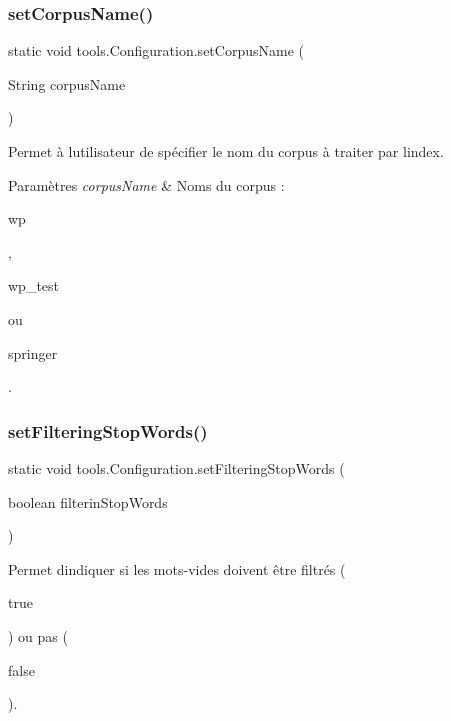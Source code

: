 \subsubsection{\texorpdfstring{set\+Corpus\+Name()}{setCorpusName()}}
{\footnotesize\ttfamily static void tools.\+Configuration.\+set\+Corpus\+Name (\begin{DoxyParamCaption}\item[{String}]{corpus\+Name }\end{DoxyParamCaption})\hspace{0.3cm}{\ttfamily [static]}}

Permet à l\textquotesingle{}utilisateur de spécifier le nom du corpus à traiter par l\textquotesingle{}index.


\begin{DoxyParams}{Paramètres}
{\em corpus\+Name} & Noms du corpus \+:
\begin{DoxyCode}
wp 
\end{DoxyCode}
 ,
\begin{DoxyCode}
wp\_test 
\end{DoxyCode}
 ou
\begin{DoxyCode}
springer 
\end{DoxyCode}
 . \\
\hline
\end{DoxyParams}
\mbox{\label{classtools_1_1Configuration_a1520b6e7f8a9a2f303813c73838d5a24}} 
\subsubsection{\texorpdfstring{set\+Filtering\+Stop\+Words()}{setFilteringStopWords()}}
{\footnotesize\ttfamily static void tools.\+Configuration.\+set\+Filtering\+Stop\+Words (\begin{DoxyParamCaption}\item[{boolean}]{filterin\+Stop\+Words }\end{DoxyParamCaption})\hspace{0.3cm}{\ttfamily [static]}}

Permet d\textquotesingle{}indiquer si les mots-\/vides doivent être filtrés (
\begin{DoxyCode}
\textcolor{keyword}{true} 
\end{DoxyCode}
 ) ou pas (
\begin{DoxyCode}
\textcolor{keyword}{false} 
\end{DoxyCode}
 ).


